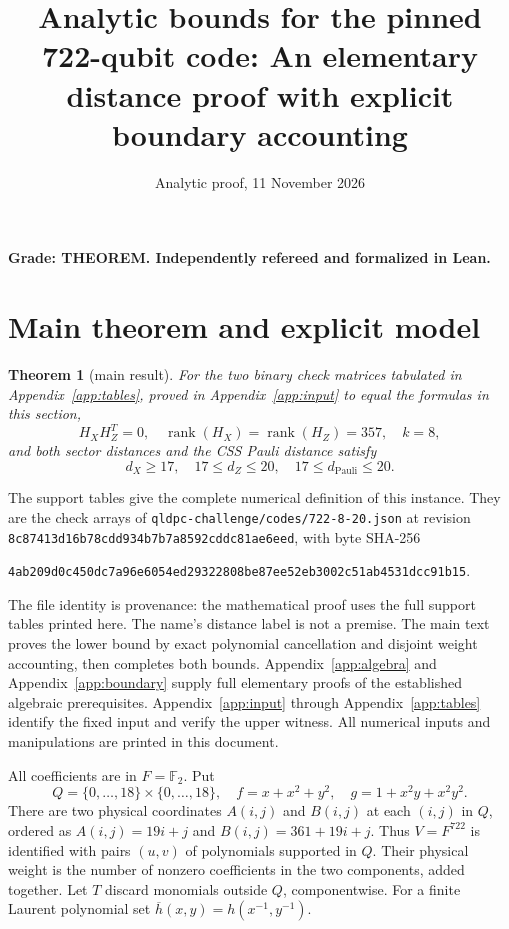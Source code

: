 \documentclass{article}
\title{Analytic bounds for the pinned 722-qubit code: An elementary distance proof with explicit boundary accounting}
\author{}
\date{Analytic proof, 11 November 2026}
\newtheorem{theorem}{Theorem}
\DeclareMathOperator{\rank}{rank}
\begin{document}
\maketitle

\textbf{Grade: THEOREM. Independently refereed and formalized in Lean.}

\section{Main theorem and explicit model}\label{sec:model}

\begin{theorem}[main result]\label{thm:main}
  For the two binary check matrices tabulated in Appendix~\ref{app:tables}, proved in
  Appendix~\ref{app:input} to equal the formulas in this section,
  \begin{equation}
    H_X H_Z^T = 0, \quad
    \rank(H_X) = \rank(H_Z) = 357, \quad k = 8,
  \end{equation}
  and both sector distances and the CSS Pauli distance satisfy
  \begin{equation}
    d_X \ge 17, \quad 17 \le d_Z \le 20, \quad 17 \le d_{\mathrm{Pauli}} \le 20.
  \end{equation}
\end{theorem}

The support tables give the complete numerical definition of this instance.
They are the check arrays of \nolinkurl{qldpc-challenge/codes/722-8-20.json} at revision
\texttt{8c87413d16b78cdd934b7b7a8592cddc81ae6eed}, with byte SHA-256
\begin{center}
  \texttt{4ab209d0c450dc7a96e6054ed29322808be87ee52eb3002c51ab4531dcc91b15}.
\end{center}

The file identity is provenance: the mathematical proof uses the full support
tables printed here. The name's distance label is not a premise.
The main text proves the lower bound by exact polynomial cancellation and
disjoint weight accounting, then completes both bounds. Appendix~\ref{app:algebra} and
Appendix~\ref{app:boundary} supply full elementary proofs of the established algebraic
prerequisites. Appendix~\ref{app:input} through Appendix~\ref{app:tables} identify the fixed
input and verify the upper witness. All numerical inputs and manipulations are printed in this
document.

All coefficients are in \(F = \mathbb{F}_2\). Put
\begin{equation}
  Q = \{0, \dots, 18\} \times \{0, \dots, 18\}, \quad
  f = x + x^2 + y^2, \quad g = 1 + x^2 y + x^2 y^2.
\end{equation}
There are two physical coordinates \(A(i,j)\) and \(B(i,j)\) at each \((i,j)\)
in \(Q\), ordered as \(A(i,j) = 19i + j\) and \(B(i,j) = 361 + 19i + j\).
Thus \(V = F^{722}\) is identified with pairs \((u,v)\) of polynomials supported
in \(Q\). Their physical weight is the number of nonzero coefficients in
the two components, added together. Let \(T\) discard monomials outside
\(Q\), componentwise. For a finite Laurent polynomial set
\(\overline{h}(x,y) = h(x^{-1}, y^{-1})\).
\end{document}
